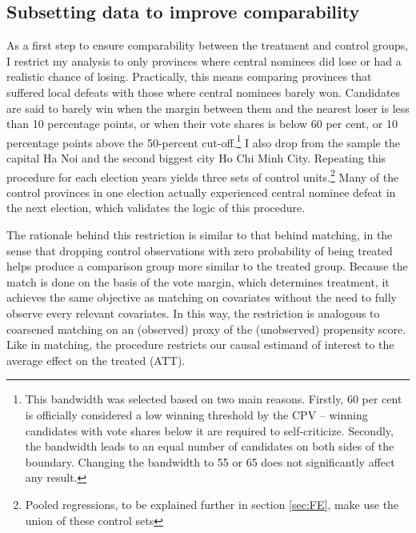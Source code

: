 \documentclass[12pt]{article}\usepackage[]{graphicx}\usepackage[]{color}
\newcommand{\1}{\mathbbm{1}}
\begin{document}

\subsection{Subsetting data to improve comparability}
As a first step to ensure comparability between the treatment and control groups, I restrict my analysis to only provinces where central nominees did lose or had a realistic chance of losing.  Practically, this means comparing provinces that suffered local defeats with those where central nominees barely won. Candidates are said to barely win when the margin between them and the nearest loser is less than 10 percentage points, or when their vote shares is below 60 per cent, or 10 percentage points above the 50-percent cut-off.\footnote{This bandwidth was selected based on two main reasons. Firstly, 60 per cent is officially considered a low winning threshold by the CPV – winning candidates with vote shares below it are required to self-criticize. Secondly, the bandwidth leads to an equal number of candidates on both sides of the boundary. Changing the bandwidth to 55 or 65 does not significantly affect any result.} I also drop from the sample the capital Ha Noi and the second biggest city Ho Chi Minh City. Repeating this procedure for each election years yields three sets of control units.\footnote{Pooled regressions, to be explained further in section \ref{sec:FE}, make use the union of these control sets} Many of the control provinces in one election actually experienced central nominee defeat in the next election, which validates the logic of this procedure.

The rationale behind this restriction is similar to that behind matching, in the sense that dropping control observations with zero probability of being treated helps produce a comparison group more similar to the treated group. Because the match is done on the basis of the vote margin, which determines treatment, it achieves the same objective as matching on covariates without the need to fully observe every relevant covariates. In this way, the restriction is analogous to coarsened matching on an (observed) proxy of the (unobserved) propensity score. Like in matching, the procedure restricts our causal estimand of interest to the average effect on the treated (ATT).
\end{document}
